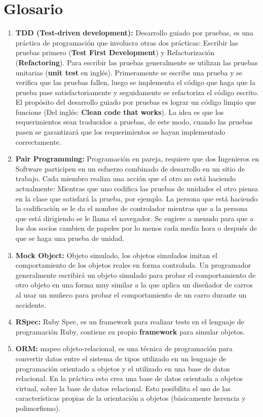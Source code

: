 \chapter{Glosario}
\begin{enumerate}
	
\item \textbf{TDD (Test-driven development):} Desarrollo guiado por pruebas, es una práctica de programación que involucra otras dos prácticas: Escribir las pruebas primero (\textbf{Test First Development}) y Refactorización (\textbf{Refactoring}). Para escribir las pruebas generalmente se utilizan las pruebas unitarias (\textbf{unit test} en inglés). Primeramente se escribe una prueba y se verifica que las pruebas fallen, luego se implementa el código que haga que la prueba pase satisfactoriamente y seguidamente se refactoriza el código escrito. El propósito del desarrollo guiado por pruebas es lograr un código limpio que funcione (Del inglés: \textbf{Clean code that works}). La idea es que los requerimientos sean traducidos a pruebas, de este modo, cuando las pruebas pasen se garantizará que los requerimientos se hayan implementado correctamente.
\item \textbf{Pair Programming:} Programación en pareja,  requiere que dos Ingenieros en Software participen en un esfuerzo combinado de desarrollo en un sitio de trabajo. Cada miembro realiza una acción que el otro no está haciendo actualmente: Mientras que uno codifica las pruebas de unidades el otro piensa en la clase que satisfará la prueba, por ejemplo.
La persona que está haciendo la codificación se le da el nombre de controlador mientras que a la persona que está dirigiendo se le llama el navegador. Se sugiere a menudo para que a los dos socios cambien de papeles por lo menos cada media hora o después de que se haga una prueba de unidad.
\item \textbf{Mock Object:} Objeto simulado, los objetos simulados imitan el comportamiento de los objetos reales en forma controlada. Un programador generalmente escribirá un objeto simulado para probar el comportamiento de otro objeto en una forma muy similar a la que aplica un diseñador de carros al usar un muñeco para probar el comportamiento de un carro durante un accidente.
\item \textbf{RSpec:} Ruby Spec, es un framework para realizar tests en el lenguaje de programación Ruby, contiene su propio \textbf{framework} para simular objetos.
\item \textbf{ORM:} mapeo objeto-relacional, es una técnica de programación para convertir datos entre el sistema de tipos utilizado en un lenguaje de programación orientado a objetos y el utilizado en una base de datos relacional. En la práctica esto crea una base de datos orientada a objetos virtual, sobre la base de datos relacional. Esto posibilita el uso de las características propias de la orientación a objetos (básicamente herencia y polimorfismo).

\end{enumerate}
